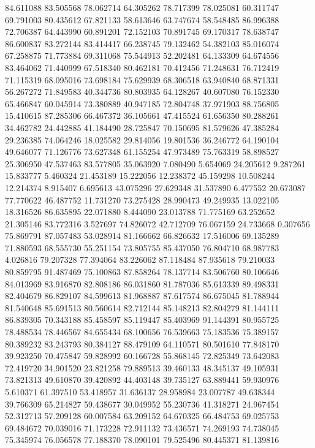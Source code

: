 84.611088
83.505568
78.062714
64.305262
78.717399
78.025081
60.311747
69.791003
80.435612
67.821133
58.613646
63.747674
58.548485
86.996388
72.706387
64.443990
60.891201
72.152103
70.891745
69.170317
78.638747
86.600837
83.272144
83.414417
66.238745
79.132462
54.382103
85.016074
67.258875
71.773884
69.311068
75.544913
52.202481
64.133309
64.674556
83.464062
71.440999
67.518340
80.462181
70.412456
71.248631
76.712419
71.115319
68.095016
73.698184
75.629939
68.306518
63.940840
68.871331
56.267272
71.849583
40.344736
80.803935
64.128267
40.607080
76.152330
65.466847
60.045914
73.380889
40.947185
72.804748
37.971903
88.756805
15.410615
87.285306
66.467372
36.105661
47.415524
61.656350
80.288261
34.462782
24.442885
41.184490
28.725847
70.150695
81.579626
47.385284
29.236385
74.064246
18.025582
29.814056
19.801536
36.246772
64.190104
49.646077
71.126776
73.627348
61.155254
47.973489
75.763319
58.898527
25.306950
47.537463
83.577805
35.063920
7.080490
5.654069
24.205612
9.287261
15.833777
5.460324
21.453189
15.222056
12.238372
45.159298
10.508244
12.214374
8.915407
6.695613
43.075296
27.629348
31.537890
6.477552
20.673087
77.770622
46.487752
11.731270
73.275428
28.990473
49.249935
13.022105
18.316526
86.635895
22.071880
8.444090
23.013788
71.775169
63.252652
21.305146
83.772316
3.527697
74.826072
42.712709
76.067159
24.733668
0.307656
75.869791
87.057483
53.028914
81.166662
66.826632
17.516006
69.135289
71.880593
68.555730
55.251154
73.805755
85.437050
76.804710
68.987783
4.026816
79.207328
77.394064
83.226062
87.118484
87.935618
79.210033
80.859795
91.487469
75.100863
87.858264
78.137714
83.506760
80.106646
84.013969
83.916870
82.808186
86.031860
81.787036
85.613339
89.498331
82.404679
86.829107
84.599613
81.968887
87.617574
86.675045
81.788944
81.540648
85.691513
80.560614
82.712144
85.148213
82.804279
81.144111
86.839305
70.343188
85.458597
85.119447
85.403969
91.144391
80.955725
78.488534
78.446567
84.655434
68.100656
76.539663
75.183536
75.389157
80.389232
83.243793
80.384127
88.479109
64.110571
80.501610
77.848170
39.923250
70.475847
59.828992
60.166728
55.868145
72.825349
73.642083
72.419720
34.901520
23.821258
79.889513
39.460133
48.345137
49.105931
73.821313
49.610870
39.420892
44.403148
39.735127
63.889441
59.930976
5.610371
61.397510
53.418957
31.636137
28.958984
23.007787
49.638344
39.766309
65.214827
59.438677
30.049952
55.230736
41.318271
24.967454
52.312713
57.209128
60.007584
63.209152
64.670325
66.484753
69.025753
69.484672
70.039016
71.173228
72.911132
73.436571
74.269193
74.738045
75.345974
76.056578
77.188370
78.090101
79.525496
80.445371
81.139816
